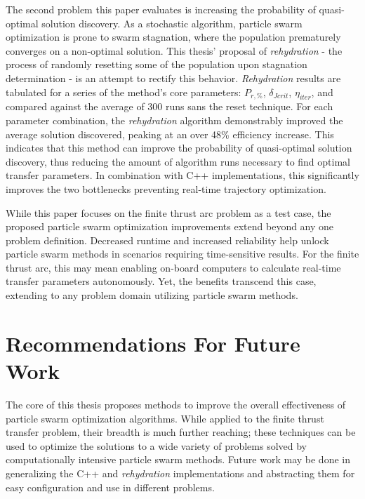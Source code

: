 \noindent The second problem this paper evaluates is increasing the probability of quasi-optimal solution 
discovery. As a stochastic algorithm, particle swarm optimization is prone to swarm stagnation, where the 
population prematurely converges on a non-optimal solution. This thesis' proposal of \textit{rehydration}
- the process of randomly resetting some of the population upon stagnation determination - is an attempt 
to rectify this behavior. \textit{Rehydration} results are tabulated for a series of the method's core parameters: $P_{r,\%}$,
$\delta_{Jcrit}$, $\eta_{iter}$, and compared against the average of 300 runs sans the reset technique. For each 
parameter combination, the \textit{rehydration} algorithm demonstrably improved the average solution discovered, peaking 
at an over 48\% efficiency increase.
This indicates that this method can improve the probability of quasi-optimal solution discovery, thus reducing the 
amount of algorithm runs necessary to find optimal transfer parameters. In combination with C++ implementations, this significantly 
improves the two bottlenecks preventing real-time trajectory optimization. \newline

\noindent While this paper focuses on the finite thrust arc problem as a test case, the proposed particle swarm optimization 
improvements extend beyond any one problem definition. Decreased runtime and increased reliability help
unlock particle swarm methods in scenarios requiring time-sensitive results. For the finite thrust arc, this may mean enabling 
on-board computers to calculate real-time transfer parameters autonomously. Yet, the benefits transcend this case,
extending to any problem domain utilizing particle swarm methods. \newline

\section{Recommendations For Future Work}

\noindent The core of this thesis proposes methods to improve the overall effectiveness of particle swarm 
optimization algorithms. While applied to the finite thrust transfer problem, their breadth is much further
reaching; these techniques can be used to optimize the solutions to a
wide variety of problems solved by computationally intensive particle swarm methods. Future work may be done in 
generalizing the C++ and \textit{rehydration} implementations and abstracting them for easy configuration and use 
in different problems. \newline

